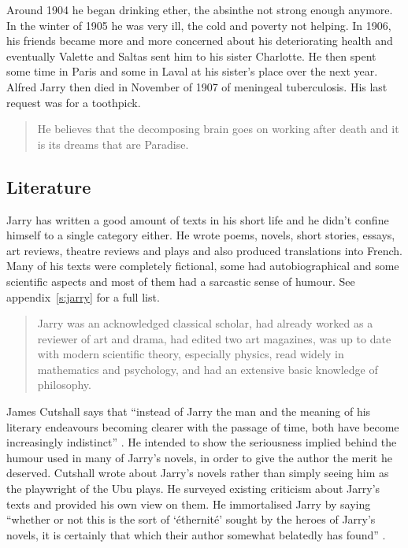 Around 1904 he began drinking ether, the absinthe not strong enough anymore. In the winter of 1905 he was very ill, the cold and poverty not helping. In 1906, his friends became more and more concerned about his deteriorating health and eventually Valette and Saltas sent him to his sister Charlotte. He then spent some time in Paris and some in Laval at his sister's place over the next year. Alfred Jarry then died in November of 1907 of meningeal tuberculosis. His last request was for a toothpick.

\begin{quotation}
  He believes that the decomposing brain goes on working after death and it is its dreams that are Paradise. 
\end{quotation}


\subsection{Literature}

Jarry has written a good amount of texts in his short life and he didn't confine himself to a single category either. He wrote poems, novels, short stories, essays, art reviews, theatre reviews and plays and also produced translations into French. Many of his texts were completely fictional, some had autobiographical and some scientific aspects and most of them had a sarcastic sense of humour. See appendix~\ref{s:jarry} for a full list.

\begin{quotation}
  Jarry was an acknowledged classical scholar, had already worked as a reviewer of art and drama, had edited two art magazines, was up to date with modern scientific theory, especially physics, read widely in mathematics and psychology, and had an extensive basic knowledge of philosophy. 
\end{quotation}

James Cutshall says that ``instead of Jarry the man and the meaning of his literary endeavours becoming clearer with the passage of time, both have become increasingly indistinct'' \autocite*{Cutshall1988}. He intended to show the seriousness implied behind the humour used in many of Jarry's novels, in order to give the author the merit he deserved. Cutshall wrote about Jarry's novels rather than simply seeing him as the playwright of the Ubu plays. He surveyed existing criticism about Jarry's texts and provided his own view on them. He immortalised Jarry by saying ``whether or not this is the sort of `éthernité' sought by the heroes of Jarry's novels, it is certainly that which their author somewhat belatedly has found'' \autocite{Cutshall1988}.

